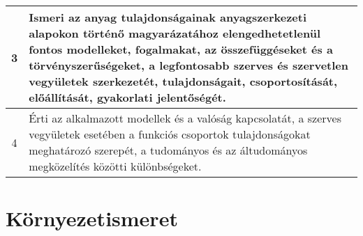 \begin{longtable}{c | p{12cm} }
                                
                                          3 &  Ismeri az anyag tulajdonságainak anyagszerkezeti alapokon történő magyarázatához elengedhetetlenül fontos modelleket, fogalmakat, az összefüggéseket és a törvényszerűségeket, a legfontosabb szerves és szervetlen vegyületek szerkezetét, tulajdonságait, csoportosítását, előállítását, gyakorlati jelentőségét. \\ \hline
                                      
                                
                                          4 &  Érti az alkalmazott modellek és a valóság kapcsolatát, a szerves vegyületek esetében a funkciós csoportok tulajdonságokat meghatározó szerepét, a tudományos és az áltudományos megközelítés közötti különbségeket. \\ \hline
                                      
                        \end{longtable}
            \clearpage

        \section{Környezetismeret}

